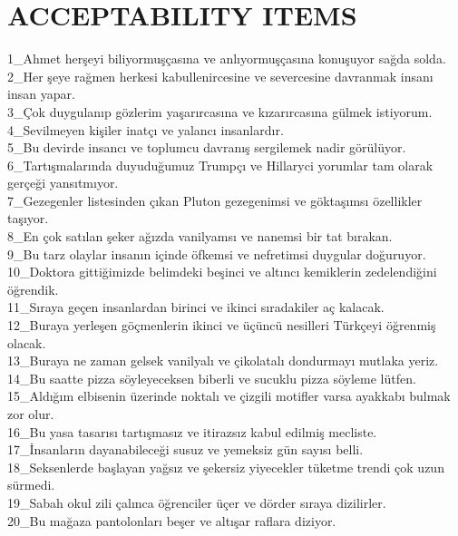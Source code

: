 \chapter{\MakeUppercase{Acceptability Items}} \label{acceptabilityitems}

1\_Ahmet herşeyi biliyormuşçasına ve anlıyormuşçasına konuşuyor sağda solda. \\
2\_Her şeye rağmen herkesi kabullenircesine ve severcesine davranmak insanı insan yapar. \\
3\_Çok duygulanıp gözlerim yaşarırcasına ve kızarırcasına gülmek istiyorum. \\
4\_Sevilmeyen kişiler inatçı ve yalancı insanlardır. \\
5\_Bu devirde insancı ve toplumcu davranış sergilemek nadir görülüyor. \\
6\_Tartışmalarında duyuduğumuz Trumpçı ve Hillaryci yorumlar tam olarak gerçeği yansıtmıyor. \\
7\_Gezegenler listesinden çıkan Pluton gezegenimsi ve göktaşımsı özellikler taşıyor. \\
8\_En çok satılan şeker ağızda vanilyamsı ve nanemsi bir tat bırakan. \\
9\_Bu tarz olaylar insanın içinde öfkemsi ve nefretimsi duygular doğuruyor. \\
10\_Doktora gittiğimizde belimdeki beşinci ve altıncı kemiklerin zedelendiğini öğrendik. \\
11\_Sıraya geçen insanlardan birinci ve ikinci sıradakiler aç kalacak. \\
12\_Buraya yerleşen göçmenlerin ikinci ve üçüncü nesilleri Türkçeyi öğrenmiş olacak. \\
13\_Buraya ne zaman gelsek vanilyalı ve çikolatalı dondurmayı mutlaka yeriz. \\
14\_Bu saatte pizza söyleyeceksen biberli ve sucuklu pizza söyleme lütfen. \\
15\_Aldığım elbisenin üzerinde noktalı ve çizgili motifler varsa ayakkabı bulmak zor olur. \\
16\_Bu yasa tasarısı tartışmasız ve itirazsız kabul edilmiş mecliste. \\
17\_İnsanların dayanabileceği susuz ve yemeksiz gün sayısı belli. \\
18\_Seksenlerde başlayan yağsız ve şekersiz yiyecekler tüketme trendi çok uzun sürmedi. \\
19\_Sabah okul zili çalınca öğrenciler üçer ve dörder sıraya dizilirler. \\
20\_Bu mağaza pantolonları beşer ve altışar raflara diziyor. \\
